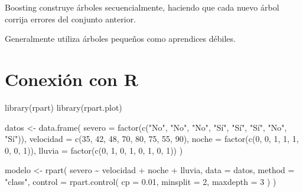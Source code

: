 \documentclass[
  spanish,
  10.5pt,
  letterpaper,
  DIV=11,
  numbers=noendperiod,
  oneside,
  open=any]{scrreprt}
\newenvironment{Shaded}{\begin{snugshade}}{\end{snugshade}}
\newcommand{\AttributeTok}[1]{\textcolor[rgb]{0.40,0.45,0.13}{#1}}
\newcommand{\DecValTok}[1]{\textcolor[rgb]{0.68,0.00,0.00}{#1}}
\newcommand{\FloatTok}[1]{\textcolor[rgb]{0.68,0.00,0.00}{#1}}
\newcommand{\FunctionTok}[1]{\textcolor[rgb]{0.28,0.35,0.67}{#1}}
\newcommand{\NormalTok}[1]{\textcolor[rgb]{0.00,0.23,0.31}{#1}}
\newcommand{\OtherTok}[1]{\textcolor[rgb]{0.00,0.23,0.31}{#1}}
\newcommand{\SpecialCharTok}[1]{\textcolor[rgb]{0.37,0.37,0.37}{#1}}
\newcommand{\StringTok}[1]{\textcolor[rgb]{0.13,0.47,0.30}{#1}}
\theoremstyle{definition}
\theoremstyle{definition}
\theoremstyle{plain}
\theoremstyle{remark}
\begin{document}

Boosting construye árboles secuencialmente, haciendo que cada nuevo
árbol corrija errores del conjunto anterior.

Generalmente utiliza árboles pequeños como aprendices débiles.

\section*{Conexión con R}\label{conexiuxf3n-con-r-11}


\begin{Shaded}
\begin{Highlighting}[numbers=left,,]
\FunctionTok{library}\NormalTok{(rpart)}
\FunctionTok{library}\NormalTok{(rpart.plot)}

\NormalTok{datos }\OtherTok{\textless{}{-}} \FunctionTok{data.frame}\NormalTok{(}
  \AttributeTok{severo =} \FunctionTok{factor}\NormalTok{(}\FunctionTok{c}\NormalTok{(}\StringTok{"No"}\NormalTok{, }\StringTok{"No"}\NormalTok{, }\StringTok{"No"}\NormalTok{, }\StringTok{"Sí"}\NormalTok{, }\StringTok{"Sí"}\NormalTok{, }\StringTok{"Sí"}\NormalTok{, }\StringTok{"No"}\NormalTok{, }\StringTok{"Sí"}\NormalTok{)),}
  \AttributeTok{velocidad =} \FunctionTok{c}\NormalTok{(}\DecValTok{35}\NormalTok{, }\DecValTok{42}\NormalTok{, }\DecValTok{48}\NormalTok{, }\DecValTok{70}\NormalTok{, }\DecValTok{80}\NormalTok{, }\DecValTok{75}\NormalTok{, }\DecValTok{55}\NormalTok{, }\DecValTok{90}\NormalTok{),}
  \AttributeTok{noche =} \FunctionTok{factor}\NormalTok{(}\FunctionTok{c}\NormalTok{(}\DecValTok{0}\NormalTok{, }\DecValTok{0}\NormalTok{, }\DecValTok{1}\NormalTok{, }\DecValTok{1}\NormalTok{, }\DecValTok{1}\NormalTok{, }\DecValTok{0}\NormalTok{, }\DecValTok{0}\NormalTok{, }\DecValTok{1}\NormalTok{)),}
  \AttributeTok{lluvia =} \FunctionTok{factor}\NormalTok{(}\FunctionTok{c}\NormalTok{(}\DecValTok{0}\NormalTok{, }\DecValTok{1}\NormalTok{, }\DecValTok{0}\NormalTok{, }\DecValTok{1}\NormalTok{, }\DecValTok{0}\NormalTok{, }\DecValTok{1}\NormalTok{, }\DecValTok{0}\NormalTok{, }\DecValTok{1}\NormalTok{))}
\NormalTok{)}

\NormalTok{modelo }\OtherTok{\textless{}{-}} \FunctionTok{rpart}\NormalTok{(}
\NormalTok{  severo }\SpecialCharTok{\textasciitilde{}}\NormalTok{ velocidad }\SpecialCharTok{+}\NormalTok{ noche }\SpecialCharTok{+}\NormalTok{ lluvia,}
  \AttributeTok{data =}\NormalTok{ datos,}
  \AttributeTok{method =} \StringTok{"class"}\NormalTok{,}
  \AttributeTok{control =} \FunctionTok{rpart.control}\NormalTok{(}
    \AttributeTok{cp =} \FloatTok{0.01}\NormalTok{,}
    \AttributeTok{minsplit =} \DecValTok{2}\NormalTok{,}
    \AttributeTok{maxdepth =} \DecValTok{3}
\NormalTok{  )}
\NormalTok{)}


\end{Highlighting}
\end{Shaded}
\end{document}
